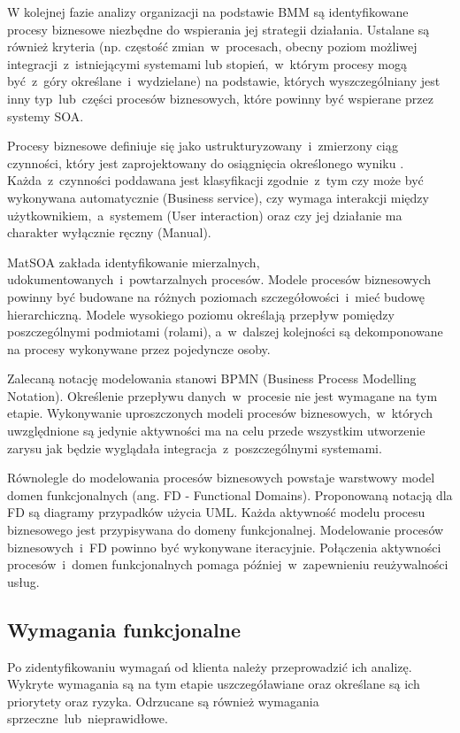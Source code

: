 W kolejnej fazie analizy organizacji na podstawie BMM są identyfikowane procesy biznesowe niezbędne do wspierania jej strategii działania. Ustalane są również kryteria (np. częstość zmian~w~procesach, obecny poziom możliwej integracji~z~istniejącymi systemami lub stopień,~w~którym procesy mogą być~z~góry określane~i~wydzielane) na podstawie, których wyszczególniany jest inny typ~lub~części procesów biznesowych, które powinny być wspierane przez systemy SOA.

Procesy biznesowe definiuje się jako ustrukturyzowany~i~zmierzony ciąg czynności, który jest zaprojektowany do osiągnięcia określonego wyniku \cite{PlatIntGor}. Każda~z~czynności poddawana jest klasyfikacji zgodnie~z~tym czy może być wykonywana automatycznie (Business service), czy wymaga interakcji między użytkownikiem,~a~systemem (User interaction) oraz czy jej działanie ma charakter wyłącznie ręczny (Manual).

MatSOA zakłada identyfikowanie mierzalnych, udokumentowanych~i~powtarzalnych procesów. Modele procesów biznesowych powinny być budowane na różnych poziomach szczegółowości~i~mieć budowę hierarchiczną. Modele wysokiego poziomu określają przepływ pomiędzy poszczególnymi podmiotami (rolami), a~w~dalszej kolejności są dekomponowane na procesy wykonywane przez pojedyncze osoby.

Zalecaną notację modelowania stanowi BPMN (Business Process Modelling Notation). Określenie przepływu danych~w~procesie nie jest wymagane na tym etapie. Wykonywanie uproszczonych modeli procesów biznesowych,~w~których uwzględnione są jedynie aktywności ma na celu przede wszystkim utworzenie zarysu jak będzie wyglądała integracja~z~poszczególnymi systemami.

Równolegle do modelowania procesów biznesowych powstaje warstwowy model domen funkcjonalnych (ang. FD - Functional Domains). Proponowaną notacją dla FD są diagramy przypadków użycia UML. Każda aktywność modelu procesu biznesowego jest przypisywana do domeny funkcjonalnej. Modelowanie procesów biznesowych~i~FD powinno być wykonywane iteracyjnie. Połączenia aktywności procesów~i~domen funkcjonalnych pomaga później~w~zapewnieniu reużywalności usług.

\subsection*{Wymagania funkcjonalne}
Po zidentyfikowaniu wymagań od klienta należy przeprowadzić ich analizę. Wykryte wymagania są na tym etapie uszczegóławiane oraz określane są ich priorytety oraz ryzyka. Odrzucane są również wymagania sprzeczne~lub~nieprawidłowe.

